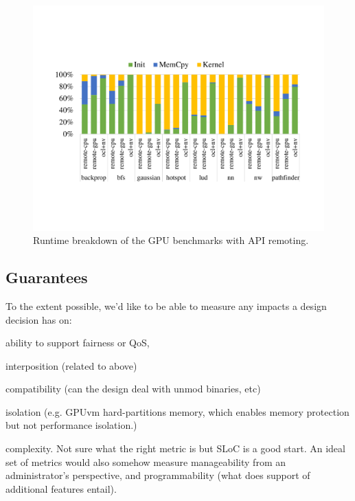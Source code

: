 \begin{figure}[!ht]
	\centering
	\hspace*{-0.25cm}\includegraphics[width=1.1\linewidth,trim={2.2cm 4.8cm 2.1cm 5cm},clip]{data/api_remote/api_remote_breakdown.pdf}
	\caption{{\footnotesize Runtime breakdown of the GPU benchmarks with API remoting.}}
	\label{fig_api_remote_breakdown} \end{figure}

\subsection{Guarantees}

To the extent possible, we'd like to be able to measure any impacts
a design decision has on:

\begin{compactitem}
\item ability to support fairness or QoS,
\item interposition (related to above)
\item compatibility (can the design deal with unmod binaries, etc)
\item isolation (e.g. GPUvm hard-partitions memory, which enables memory protection but not performance isolation.)
\item complexity. Not sure what the right metric is but SLoC is a good start. An ideal set of
	metrics would also somehow measure manageability from an administrator's perspective, and
	programmability (what does support of additional features entail).
\end{compactitem}


